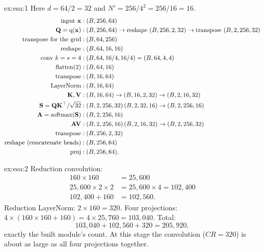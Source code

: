 
\begin{solution}{ex:esa:1}
Here $d = 64/2 = 32$ and $N' = 256/4^2 = 256/16 = 16$.
\begin{align*}
  \text{input } \mathbf{x} &: (B, 256, 64)\\
  \mathbf{Q} = \text{q}(\mathbf{x}) &: (B, 256, 64) \to \text{reshape } (B, 256, 2, 32) \to \text{transpose } (B, 2, 256, 32)\\
  \text{transpose for the grid} &: (B, 64, 256)\\
  \text{reshape} &: (B, 64, 16, 16)\\
  \text{conv } k = s = 4 &: (B, 64, 16/4, 16/4) = (B, 64, 4, 4)\\
  \text{flatten(2)} &: (B, 64, 16)\\
  \text{transpose} &: (B, 16, 64)\\
  \text{LayerNorm} &: (B, 16, 64)\\
  \mathbf{K}, \mathbf{V} &: (B, 16, 64) \to (B, 16, 2, 32) \to (B, 2, 16, 32)\\
  \mathbf{S} = \mathbf{Q}\mathbf{K}^{\top}/\sqrt{32} &: (B, 2, 256, 32)\,(B, 2, 32, 16) \to (B, 2, 256, 16)\\
  \mathbf{A} = \operatorname{softmax}(\mathbf{S}) &: (B, 2, 256, 16)\\
  \mathbf{A}\mathbf{V} &: (B, 2, 256, 16)\,(B, 2, 16, 32) \to (B, 2, 256, 32)\\
  \text{transpose} &: (B, 256, 2, 32)\\
  \text{reshape (concatenate heads)} &: (B, 256, 64)\\
  \text{proj} &: (B, 256, 64).
\end{align*}
\end{solution}

\begin{solution}{ex:esa:2}
Reduction convolution:
\begin{align*}
  160\times160 &= 25{,}600\\
  25{,}600\times2\times2 &= 25{,}600\times4 = 102{,}400\\
  102{,}400 + 160 &= 102{,}560 .
\end{align*}
Reduction LayerNorm: $2\times160 = 320$. Four projections:
$4\times(160\times160 + 160) = 4\times25{,}760 = 103{,}040$. Total:
\[
  103{,}040 + 102{,}560 + 320 = 205{,}920,
\]
exactly the built module's count. At this stage the convolution ($CR = 320$) is about as large as
all four projections together.
\end{solution}

